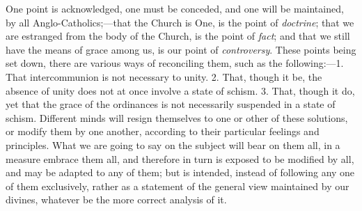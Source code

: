 One point is acknowledged, one must be conceded,
and one will be maintained, by all Anglo-Catholics;—that the Church
is One, is the point of \emph{doctrine}; that we are estranged from
the body of the Church, is the point of \emph{fact}; and that we still
have the means of grace among us, is our point of \emph{controversy}.
These points being set down, there are various ways of reconciling
them, such as the following:—1. That intercommunion is not necessary
to unity. 2. That, though it be, the absence of unity does not at once
involve a state of schism. 3. That, though it do, yet that the grace
of the ordinances is not necessarily suspended in a state of schism.
Different minds will resign themselves to one or other of these
solutions, or modify them by one another, according to their
particular feelings and principles. What we are going to say on
the subject will bear on them all, in a measure embrace them all, and
therefore in turn is exposed to be modified by all, and may be adapted
to any of them; but is intended, instead of following any one of them
exclusively, rather as a statement of the general view maintained by
our divines, whatever be the more correct analysis of it.

